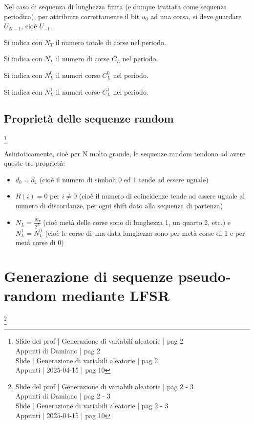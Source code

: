 Nel caso di sequenza di lunghezza finita (e dunque trattata come sequenza periodica), 
per attribuire correttamente il bit $u_0$ ad una corsa, si deve guardare $U_{N-1}$, cioè $U_{-1}$. \newline 

Si indica con $N_T$ il numero totale di corse nel periodo. \newline 

Si indica con $N_L$ il numero di corse $C_L$ nel periodo. \newline 

Si indica con $N_L^{0}$ il numeri corse $C_L^{0}$ nel periodo. \newline 

Si indica con $N_L^{1}$ il numeri corse $C_L^{1}$ nel periodo. \newline 

\newpage 

\subsection{Proprietà delle sequenze random}
\footnote{Slide del prof | Generazione di variabili aleatorie | pag 2 \\
Appunti di Damiano | pag 2 \\ 
Slide | Generazione di variabili aleatorie | pag  2\\ 
Appunti | 2025-04-15 | pag 10
} 

Asintoticamente, cioè per N molto grande, le sequenze random tendono ad avere queste tre proprietà: 

\begin{itemize}
    \item $d_0 = d_1$ (cioè il numero di simboli 0 ed 1 tende ad essere uguale) 
    \item $R(i) = 0$ per $i \neq 0$ (cioè il numero di coincidenze tende ad essere uguale al numero di discordanze, per ogni shift dato alla sequenza di partenza) 
    \item $N_L = \frac{N_T}{2^{L}}$ (cioè metà delle corse sono di lunghezza 1, un quarto 2, etc.) e $N_L^{1} = N_L^{0}$ (cioè le corse di una data lunghezza sono per metà corse di 1 e per metà corse di 0)
\end{itemize}

\newpage 

\section{Generazione di sequenze pseudo-random mediante LFSR}
\footnote{Slide del prof | Generazione di variabili aleatorie | pag 2 - 3\\
Appunti di Damiano | pag 2 - 3\\ 
Slide | Generazione di variabili aleatorie | pag  2 - 3\\ 
Appunti | 2025-04-15 | pag 10
} 

